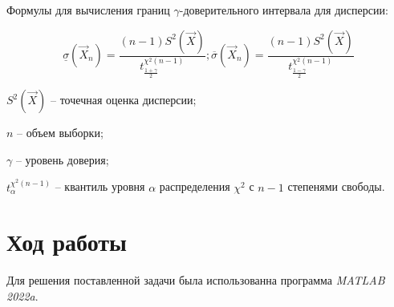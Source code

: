 \documentclass[12pt]{report}
\begin{document}
Формулы для вычисления границ $\gamma$-доверительного интервала для дисперсии:

\begin{equation}
	\underline\sigma(\vec X_n)= \frac{(n-1)S^2(\vec X)}{t^{\chi^2(n-1)}_{\frac{1+\gamma}{2}}}; \overline\sigma(\vec X_n)= \frac{(n-1)S^2(\vec X)}{t^{\chi^2(n-1)}_{\frac{1-\gamma}{2}}}
\end{equation}

$S^2(\vec X)$ -- точечная оценка дисперсии;

$n$ -- объем выборки;

$\gamma$ -- уровень доверия;

$t^{\chi^2(n-1)}_{\alpha}$ -- квантиль уровня $\alpha$ распределения $\chi^2$ с $n - 1$ степенями свободы.

\chapter*{Ход работы}
Для решения поставленной задачи была использованна программа \textit{MATLAB 2022a}.
\end{document}
